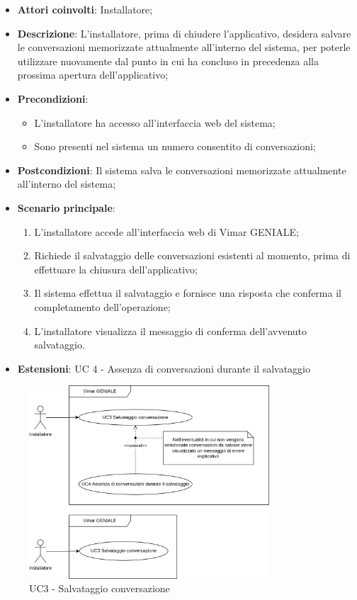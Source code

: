 \begin{itemize}
    \item \textbf{Attori coinvolti}: Installatore;
    \item \textbf{Descrizione}: L’installatore, prima di chiudere l’applicativo, desidera salvare le conversazioni memorizzate attualmente all’interno del sistema, per poterle utilizzare nuovamente dal punto in cui ha concluso in precedenza alla prossima apertura dell’applicativo;
    \item \textbf{Precondizioni}: 
        \begin{itemize}
            \item L’installatore ha accesso all’interfaccia web del sistema;
            \item Sono presenti nel sistema un numero consentito di conversazioni;
        \end{itemize}
    \item \textbf{Postcondizioni}: Il sistema salva le conversazioni memorizzate attualmente all’interno del sistema;
    \item \textbf{Scenario principale}:
    \begin{enumerate}
    \item L’installatore accede all’interfaccia web di Vimar GENIALE;
    \item Richiede il salvataggio delle conversazioni esistenti al momento, prima di effettuare la chiusura dell’applicativo;
    \item Il sistema effettua il salvataggio e fornisce una risposta che conferma il completamento dell’operazione;
    \item L’installatore visualizza il messaggio di conferma dell’avvenuto salvataggio.
    \end{enumerate}
    \item \textbf{Estensioni}: UC 4 - Assenza di conversazioni durante il salvataggio
\end{itemize}
\begin{figure}[H]
\centering
\includegraphics[width=0.8\textwidth]{contents/casi_duso/png/UC3.png}
\caption{UC3 - Salvataggio conversazione}
\end{figure}

